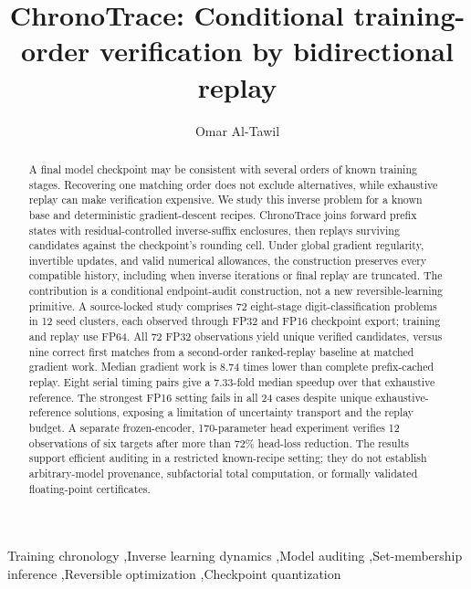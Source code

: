 \documentclass[preprint,11pt]{elsarticle}
\providecommand{\paperroot}{.}
\begin{document}
\begin{frontmatter}
\title{ChronoTrace: Conditional training-order verification by bidirectional replay}
\author{Omar Al-Tawil}
\begin{abstract}
A final model checkpoint may be consistent with several orders of known training stages. Recovering one matching order does not exclude alternatives, while exhaustive replay can make verification expensive. We study this inverse problem for a known base and deterministic gradient-descent recipes. ChronoTrace joins forward prefix states with residual-controlled inverse-suffix enclosures, then replays surviving candidates against the checkpoint's rounding cell. Under global gradient regularity, invertible updates, and valid numerical allowances, the construction preserves every compatible history, including when inverse iterations or final replay are truncated. The contribution is a conditional endpoint-audit construction, not a new reversible-learning primitive. A source-locked study comprises 72 eight-stage digit-classification problems in 12 seed clusters, each observed through FP32 and FP16 checkpoint export; training and replay use FP64. All 72 FP32 observations yield unique verified candidates, versus nine correct first matches from a second-order ranked-replay baseline at matched gradient work. Median gradient work is 8.74 times lower than complete prefix-cached replay. Eight serial timing pairs give a 7.33-fold median speedup over that exhaustive reference. The strongest FP16 setting fails in all 24 cases despite unique exhaustive-reference solutions, exposing a limitation of uncertainty transport and the replay budget. A separate frozen-encoder, 170-parameter head experiment verifies 12 observations of six targets after more than 72\% head-loss reduction. The results support efficient auditing in a restricted known-recipe setting; they do not establish arbitrary-model provenance, subfactorial total computation, or formally validated floating-point certificates.
\end{abstract}
\begin{keyword}
Training chronology \sep Inverse learning dynamics \sep Model auditing \sep Set-membership inference \sep Reversible optimization \sep Checkpoint quantization
\end{keyword}
\end{frontmatter}









\end{document}
